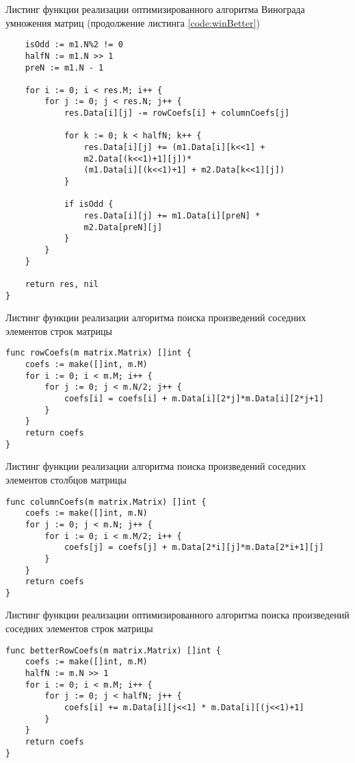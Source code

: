\begin{code}
\caption{Листинг функции реализации оптимизированного алгоритма Винограда умножения матриц (продолжение листинга \ref{code:winBetter})}
\label{code:winBetter2}
\begin{verbatim}
	isOdd := m1.N%2 != 0
	halfN := m1.N >> 1
	preN := m1.N - 1

	for i := 0; i < res.M; i++ {
		for j := 0; j < res.N; j++ {
			res.Data[i][j] -= rowCoefs[i] + columnCoefs[j]

			for k := 0; k < halfN; k++ {
				res.Data[i][j] += (m1.Data[i][k<<1] + 
				m2.Data[(k<<1)+1][j])*
				(m1.Data[i][(k<<1)+1] + m2.Data[k<<1][j])
			}

			if isOdd {
				res.Data[i][j] += m1.Data[i][preN] *
				m2.Data[preN][j]
			}
		}
	}

	return res, nil
}
\end{verbatim}
\end{code}

\newpage

\begin{code}
\caption{Листинг функции реализации алгоритма поиска произведений соседних элементов строк матрицы}
\label{code:rc}
\begin{verbatim}
func rowCoefs(m matrix.Matrix) []int {
	coefs := make([]int, m.M)
	for i := 0; i < m.M; i++ {
		for j := 0; j < m.N/2; j++ {
			coefs[i] = coefs[i] + m.Data[i][2*j]*m.Data[i][2*j+1]
		}
	}
	return coefs
}
\end{verbatim}
\end{code}

\begin{code}
\caption{Листинг функции реализации алгоритма поиска произведений соседних элементов столбцов матрицы}
\label{code:cc}
\begin{verbatim}
func columnCoefs(m matrix.Matrix) []int {
	coefs := make([]int, m.N)
	for j := 0; j < m.N; j++ {
		for i := 0; i < m.M/2; i++ {
			coefs[j] = coefs[j] + m.Data[2*i][j]*m.Data[2*i+1][j]
		}
	}
	return coefs
}
\end{verbatim}
\end{code}

\newpage

\begin{code}
\caption{Листинг функции реализации оптимизированного алгоритма поиска произведений соседних элементов строк матрицы}
\label{code:rcBetter}
\begin{verbatim}
func betterRowCoefs(m matrix.Matrix) []int {
	coefs := make([]int, m.M)
	halfN := m.N >> 1
	for i := 0; i < m.M; i++ {
		for j := 0; j < halfN; j++ {
			coefs[i] += m.Data[i][j<<1] * m.Data[i][(j<<1)+1]
		}
	}
	return coefs
}
\end{verbatim}
\end{code}


